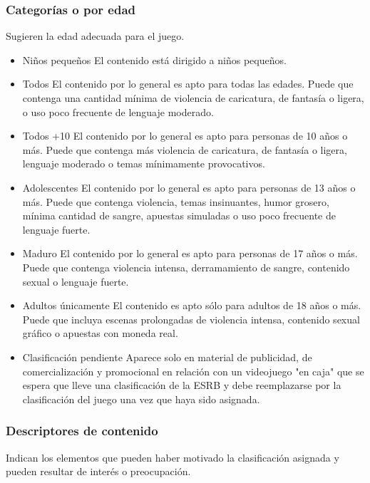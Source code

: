 \subsubsection{Categorías o por edad}
Sugieren la edad adecuada para el juego.			
			\begin{itemize}
			\item Niños pequeños
			El contenido está dirigido a niños pequeños.
			
			\item Todos
			El contenido por lo general es apto para todas las edades. Puede que contenga una cantidad mínima de violencia de caricatura, de fantasía o ligera, o uso poco frecuente de lenguaje moderado.
			
			\item Todos +10
			El contenido por lo general es apto para personas de 10 años o más. Puede que contenga más violencia de caricatura, de fantasía o ligera, lenguaje moderado o temas mínimamente provocativos.
			
			\item Adolescentes
			El contenido por lo general es apto para personas de 13 años o más. Puede que contenga violencia, temas insinuantes, humor grosero, mínima cantidad de sangre, apuestas simuladas o uso poco frecuente de lenguaje fuerte.
			
			\item Maduro
			El contenido por lo general es apto para personas de 17 años o más. Puede que contenga violencia intensa, derramamiento de sangre, contenido sexual o lenguaje fuerte.
			
			\item Adultos únicamente
			El contenido es apto sólo para adultos de 18 años o más. Puede que incluya escenas prolongadas de violencia intensa, contenido sexual gráfico o apuestas con moneda real.
			
			\item Clasificación pendiente
			Aparece solo en material de publicidad, de comercialización y promocional en relación con un videojuego "en caja" que se espera que lleve una clasificación de la ESRB y debe reemplazarse por la clasificación del juego una vez que haya sido asignada.
			
		\end{itemize}
			
			
			\subsubsection{Descriptores de contenido} 
			Indican los elementos que pueden haber motivado la clasificación asignada y pueden resultar de interés o preocupación.
			
